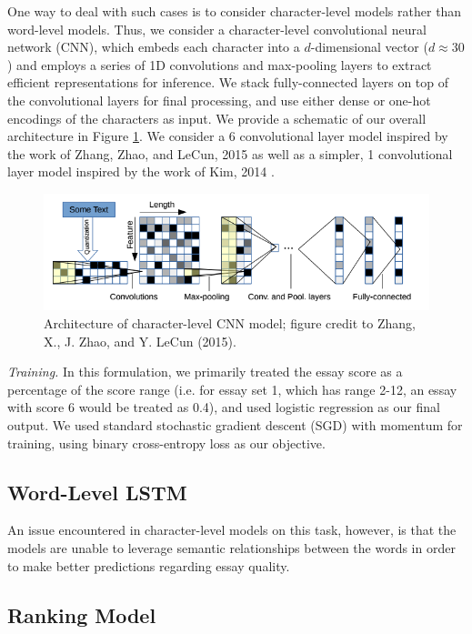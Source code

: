 \documentclass[10pt,psamsfonts]{amsart}
\theoremstyle{definition}
\theoremstyle{remark}
\numberwithin{equation}{section}
\begin{document}
One way to deal with such cases is to consider character-level models rather than word-level models. Thus, we consider a character-level convolutional neural network (CNN), which embeds each character into a $d$-dimensional vector ($d \approx 30$) and employs a series of 1D convolutions and max-pooling layers to extract efficient representations for inference. We stack fully-connected layers on top of the convolutional layers for final processing, and use either dense or one-hot encodings of the characters as input. We provide a schematic of our overall architecture in Figure \ref{fig:cnn}. We consider a 6 convolutional layer model inspired by the work of Zhang, Zhao, and LeCun, 2015 \cite{charnn} as well as a simpler, 1 convolutional layer model inspired by the work of Kim, 2014 \cite{kim14}.

\begin{figure}
	\includegraphics[width=\textwidth]{cnn.png}
	\caption{Architecture of character-level CNN model; figure credit to Zhang, X., J. Zhao, and Y. LeCun (2015).}
	\label{fig:cnn}
\end{figure}

{\em Training.} In this formulation, we primarily treated the essay score as a percentage of the score range (i.e. for essay set 1, which has range 2-12, an essay with score 6 would be treated as 0.4), and used logistic regression as our final output. We used standard stochastic gradient descent (SGD) with momentum for training, using binary cross-entropy loss as our objective.

\subsection*{Word-Level LSTM}

An issue encountered in character-level models on this task, however, is that the models are unable to leverage semantic relationships between the words in order to make better predictions regarding essay quality. 

\subsection*{Ranking Model}
\end{document}
